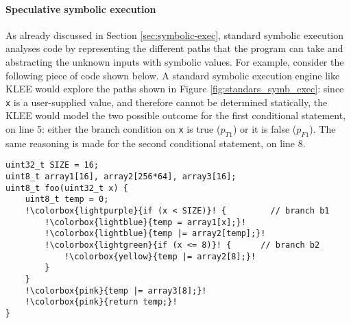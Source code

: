 \documentclass[12pt,a4paper]{book}
\theoremstyle{definition}
\begin{document}
	\paragraph{Speculative symbolic execution} As already discussed in Section \ref{sec:symbolic-exec}, standard symbolic execution analyses code by representing the different paths that the program can take and abstracting the unknown inputs with symbolic values. For example, consider the following piece of code shown below. A standard symbolic execution engine like KLEE would explore the paths shown in Figure \ref{fig:standars_symb_exec}: since \texttt{x} is a user-supplied value, and therefore cannot be determined statically, the KLEE would model the two possible outcome for the first conditional statement, on line 5: either the branch condition on \texttt{x} is true ($p_{T1}$) or it is false ($p_{F1}$). The same reasoning is made for the second conditional statement, on line 8.
	\begin{lstlisting}[escapechar=!]
uint32_t SIZE = 16; 
uint8_t array1[16], array2[256*64], array3[16];
uint8_t foo(uint32_t x) { 
	uint8_t temp = 0; 
	!\colorbox{lightpurple}{if (x < SIZE)}! {		  // branch b1
		!\colorbox{lightblue}{temp = array1[x];}!
		!\colorbox{lightblue}{temp |= array2[temp];}!
		!\colorbox{lightgreen}{if (x <= 8)}! {		// branch b2
			!\colorbox{yellow}{temp |= array2[8];}!
		}	
	}
	!\colorbox{pink}{temp |= array3[8];}!
	!\colorbox{pink}{return temp;}!
}
	\end{lstlisting}
	
\end{document}
